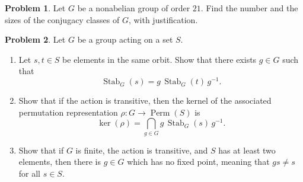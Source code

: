 \documentclass[11pt]{article}
\DeclareMathOperator{\Perm}{Perm}
\DeclareMathOperator{\Stab}{Stab}
\theoremstyle{definition}
\newtheorem{problem}{Problem}
\begin{document}
\begin{problem}
Let $G$ be a nonabelian group of order $21$. Find the number and the sizes of the conjugacy classes of $G$, with justification.
\end{problem}


\begin{problem}
	Let $G$ be a group acting on a set $S$.
	
\begin{enumerate}[label=(5.\arabic*)]	
\item Let $s, t \in S$ be elements in the same orbit. Show that there exists $g \in G$ such that
		$$\Stab_G(s) = g \, \Stab_G(t) \, g^{-1}.$$
\item Show that if the action is transitive, then the kernel of the associated permutation representation $\rho\!: G \to \Perm(S)$ is
$$\ker(\rho) = \bigcap_{g \in G} g \, \Stab_G(s) \, g^{-1}.$$
\item Show that if $G$ is finite, the action is transitive, and $S$ has at least two elements, then there is $g \in G$ which has no fixed point, meaning that $gs \neq s$ for all $s \in S$.
\end{enumerate}
\end{problem}
\end{document}
